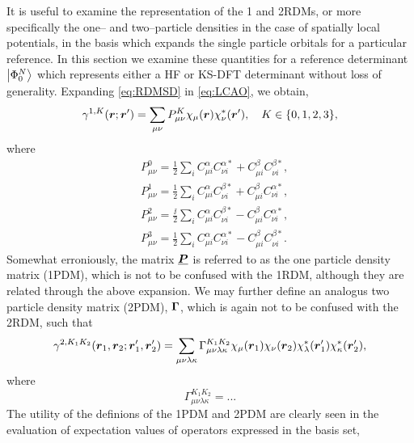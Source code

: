 It is useful to examine the representation of the 1 and 2RDMs, or more specifically the one-- and two--particle
densities in the case of spatially local potentials, in the basis which expands the single particle orbitals
for a particular reference. In this section we examine these quantities for a reference determinant $\left\vert \Phi_0^N \right\rangle$
which represents either a HF or KS-DFT determinant without loss of generality.  
Expanding \cref{eq:RDMSD} in \cref{eq:LCAO}, we obtain,
\begin{equation}
  \label{eq:DenMatEval}
  \gamma^{1,K}(\boldsymbol{r}; \boldsymbol{r}') = \sum_{\mu\nu} P_{\mu\nu}^{K} \chi_\mu(\boldsymbol{r}) \chi^*_\nu(\boldsymbol{r}'), \quad K \in \{0,1,2,3\},
\end{equation}
where
\begin{subequations}
  \label{eq:1PDM}
\begin{align}
  &P^{0}_{\mu\nu} = \frac{1}{2}   \sum_i C_{\mu i}^\alpha C_{\nu i}^{\alpha *} + C_{\mu i}^\beta  C_{\nu i}^{\beta  *},\\
  &P^{1}_{\mu\nu} = \frac{1}{2}   \sum_i C_{\mu i}^\alpha C_{\nu i}^{\beta  *} + C_{\mu i}^\beta  C_{\nu i}^{\alpha *},\\
  &P^{2}_{\mu\nu} = \frac{\ii}{2} \sum_i C_{\mu i}^\alpha C_{\nu i}^{\beta  *} - C_{\mu i}^\beta  C_{\nu i}^{\alpha *},\\
  &P^{3}_{\mu\nu} = \frac{1}{2}   \sum_i C_{\mu i}^\alpha C_{\nu i}^{\alpha *} - C_{\mu i}^\beta  C_{\nu i}^{\beta  *}.
\end{align}
\end{subequations}
Somewhat erroniously, the matrix $\boldsymbol{\underline{P}}$ is referred to as the one particle density matrix (1PDM), which is not to be
confused with the 1RDM, although they are related through the above expansion. We may further define an analogus two
particle density matrix (2PDM), $\boldsymbol{\Gamma}$, which is again not to be confused with the 2RDM, such that 
\begin{equation}
  \gamma^{2,K_1K_2}(\boldsymbol{r}_1, \boldsymbol{r}_2; \boldsymbol{r}'_1, \boldsymbol{r}'_2) = 
    \sum_{\mu\nu\lambda\kappa} \Gamma^{K_1K_2}_{\mu\nu\lambda\kappa} 
      \chi_\mu(\boldsymbol{r}_1) \chi_\nu(\boldsymbol{r}_2) \chi^*_\lambda(\boldsymbol{r}'_1) \chi^*_\kappa(\boldsymbol{r}'_2), 
\end{equation}
where 
\begin{equation}
  \Gamma^{K_1 K_2}_{\mu\nu\lambda\kappa} = ...
\end{equation}
The utility of the definions of the 1PDM and 2PDM  are clearly seen in the evaluation of expectation values
of operators expressed in the basis set,
